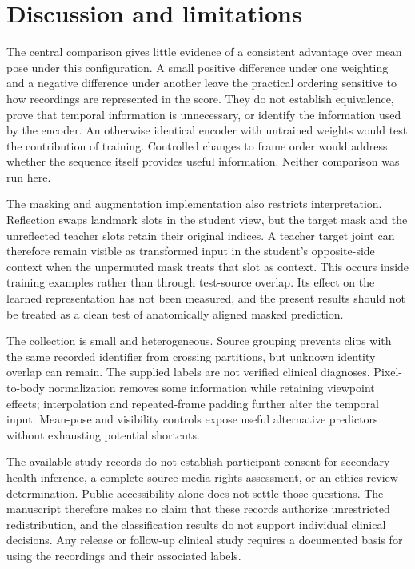 \documentclass[10pt,twocolumn,letterpaper]{article}
\begin{document}
\section{Discussion and limitations}
The central comparison gives little evidence of a consistent advantage over mean pose under this configuration. A small positive difference under one weighting and a negative difference under another leave the practical ordering sensitive to how recordings are represented in the score. They do not establish equivalence, prove that temporal information is unnecessary, or identify the information used by the encoder. An otherwise identical encoder with untrained weights would test the contribution of training. Controlled changes to frame order would address whether the sequence itself provides useful information. Neither comparison was run here.

The masking and augmentation implementation also restricts interpretation. Reflection swaps landmark slots in the student view, but the target mask and the unreflected teacher slots retain their original indices. A teacher target joint can therefore remain visible as transformed input in the student's opposite-side context when the unpermuted mask treats that slot as context. This occurs inside training examples rather than through test-source overlap. Its effect on the learned representation has not been measured, and the present results should not be treated as a clean test of anatomically aligned masked prediction.

The collection is small and heterogeneous. Source grouping prevents clips with the same recorded identifier from crossing partitions, but unknown identity overlap can remain. The supplied labels are not verified clinical diagnoses. Pixel-to-body normalization removes some information while retaining viewpoint effects; interpolation and repeated-frame padding further alter the temporal input. Mean-pose and visibility controls expose useful alternative predictors without exhausting potential shortcuts.

The available study records do not establish participant consent for secondary health inference, a complete source-media rights assessment, or an ethics-review determination. Public accessibility alone does not settle those questions. The manuscript therefore makes no claim that these records authorize unrestricted redistribution, and the classification results do not support individual clinical decisions. Any release or follow-up clinical study requires a documented basis for using the recordings and their associated labels.
\end{document}
